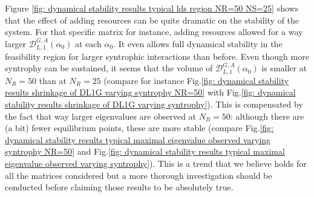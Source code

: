\documentclass[12pt, titlepage]{report}
\begin{document}
Figure \ref{fig: dynamical stability results typical lds region NR=50 NS=25} shows that the effect of adding resources can be quite dramatic on the stability of the system. For that specific matrix for instance, adding resources allowed for a way larger $\mathcal{D}^{G,A}_{L,1}\left(\alpha_0\right)$ at each $\alpha_0$. It even allows full dynamical stability in the feasibility region for larger syntrophic interactions than before.
Even though more syntrophy can be sustained, it seems that the volume of $\mathcal{D}_{L,1}^{G,A}(\alpha_0)$ is smaller at $N_R=50$ than at $N_R=25$ (compare for  instance Fig.\ref{fig: dynamical stability results shrinkage of DL1G varying syntrophy NR=50} with Fig.\ref{fig: dynamical stability results shrinkage of DL1G varying syntrophy}). This is compensated by the fact that way larger eigenvalues are observed at $N_R=50$: although there are (a bit) fewer equilibrium points, these are more stable (compare Fig.\ref{fig: dynamical stability results typical maximal eigenvalue observed varying syntrophy NR=50} and Fig.\ref{fig: dynamical stability results typical maximal eigenvalue observed varying syntrophy}). This is a trend that we believe holds for all the matrices considered but a more thorough investigation should be conducted before claiming those results to be absolutely true.
\end{document}
